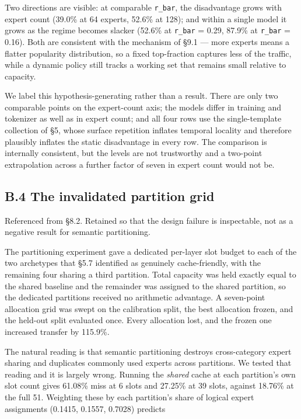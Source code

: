 \documentclass[
  10pt,
  letterpaper,
  10pt]{article}
\begin{document}
Two directions are visible: at comparable \texttt{r\_bar}, the
disadvantage grows with expert count (\textminus{}39.0\% at 64 experts,
\textminus{}52.6\% at 128); and within a single model it grows as the
regime becomes slacker (\textminus{}52.6\% at \texttt{r\_bar} = 0.29,
\textminus{}87.9\% at \texttt{r\_bar} = 0.16). Both are consistent with
the mechanism of §9.1 --- more experts means a flatter popularity
distribution, so a fixed top-fraction captures less of the traffic,
while a dynamic policy still tracks a working set that remains small
relative to capacity.

We label this hypothesis-generating rather than a result. There are only
two comparable points on the expert-count axis; the models differ in
training and tokenizer as well as in expert count; and all four rows use
the single-template collection of §5, whose surface repetition inflates
temporal locality and therefore plausibly inflates the static
disadvantage in every row. The comparison is internally consistent, but
the levels are not trustworthy and a two-point extrapolation across a
further factor of seven in expert count would not be.

\subsection{B.4 The invalidated partition
grid}\label{b.4-the-invalidated-partition-grid}

Referenced from §8.2. Retained so that the design failure is
inspectable, not as a negative result for semantic partitioning.

The partitioning experiment gave a dedicated per-layer slot budget to
each of the two archetypes that §5.7 identified as genuinely
cache-friendly, with the remaining four sharing a third partition. Total
capacity was held exactly equal to the shared baseline and the remainder
was assigned to the shared partition, so the dedicated partitions
received no arithmetic advantage. A seven-point allocation grid was
swept on the calibration split, the best allocation frozen, and the
held-out split evaluated once. Every allocation lost, and the frozen one
increased transfer by 115.9\%.

The natural reading is that semantic partitioning destroys
cross-category expert sharing and duplicates commonly used experts
across partitions. We tested that reading and it is largely wrong.
Running the \emph{shared} cache at each partition's own slot count gives
61.08\% miss at 6 slots and 27.25\% at 39 slots, against 18.76\% at the
full 51. Weighting these by each partition's share of logical expert
assignments (0.1415, 0.1557, 0.7028) predicts
\end{document}
